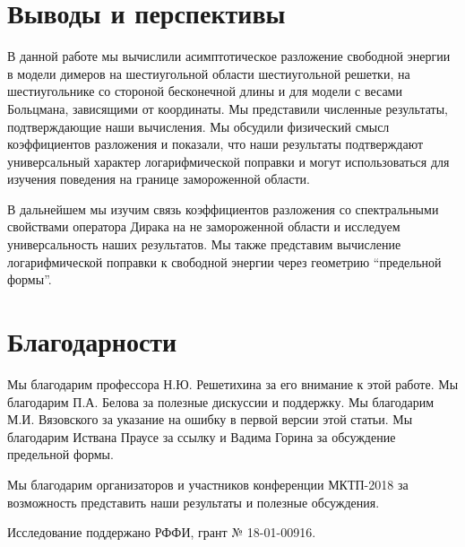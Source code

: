 \documentclass{article}
\begin{document}
\section*{Выводы и перспективы}
\label{sec:conclusion}

В данной работе мы вычислили асимптотическое разложение свободной энергии в модели димеров на
шестиугольной области шестиугольной решетки, на шестиугольнике со стороной бесконечной длины и для
модели с весами Больцмана, зависящими от координаты. Мы представили численные результаты,
подтверждающие наши вычисления. Мы обсудили физический смысл коэффициентов разложения и показали,
что наши результаты подтверждают универсальный характер логарифмической поправки и могут
использоваться для изучения поведения на границе замороженной области. 

В дальнейшем мы изучим связь коэффициентов разложения со спектральными свойствами оператора Дирака
на не замороженной области и исследуем универсальность наших результатов. Мы также представим
вычисление логарифмической поправки к свободной энергии через геометрию ``предельной формы''. 

\section*{Благодарности}
\label{sec:acknowledgements}
Мы благодарим профессора Н.Ю. Решетихина за его внимание к этой работе. Мы благодарим П.А. Белова за
полезные дискуссии и поддержку. Мы благодарим М.И. Вязовского за указание на ошибку в первой версии
этой статьи. Мы благодарим Иствана Праусе за ссылку
\cite{allegra2015exact} и Вадима Горина за обсуждение предельной формы.

Мы благодарим организаторов и участников конференции МКТП-2018 за возможность представить наши
результаты и полезные обсуждения. 

Исследование поддержано РФФИ, грант № 18-01-00916.


{} 
\end{document}
